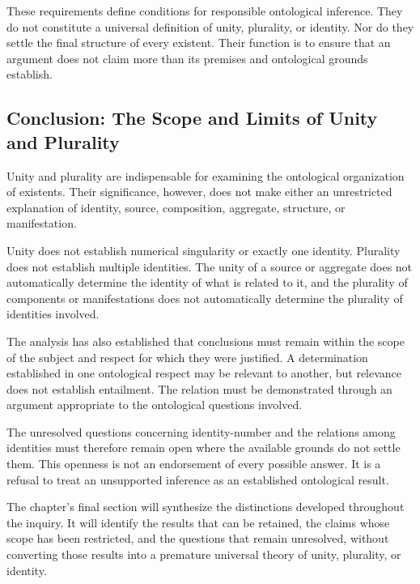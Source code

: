 

These requirements define conditions for
responsible ontological inference. They do
not constitute a universal definition of
unity, plurality, or identity. Nor do they
settle the final structure of every existent.
Their function is to ensure that an argument
does not claim more than its premises and
ontological grounds establish.

\subsection{Conclusion: The Scope and Limits of Unity and Plurality}

Unity and plurality are indispensable for
examining the ontological organization of
existents. Their significance, however,
does not make either an unrestricted
explanation of identity, source, composition,
aggregate, structure, or manifestation.

Unity does not establish numerical singularity
or exactly one identity. Plurality does not
establish multiple identities. The unity
of a source or aggregate does not automatically
determine the identity of what is related
to it, and the plurality of components or
manifestations does not automatically
determine the plurality of identities involved.

The analysis has also established that
conclusions must remain within the scope
of the subject and respect for which they
were justified. A determination established
in one ontological respect may be relevant
to another, but relevance does not establish
entailment. The relation must be demonstrated
through an argument appropriate to the
ontological questions involved.

The unresolved questions concerning
identity-number and the relations among
identities must therefore remain open
where the available grounds do not settle
them. This openness is not an endorsement
of every possible answer. It is a refusal
to treat an unsupported inference as an
established ontological result.

The chapter's final section will synthesize
the distinctions developed throughout
the inquiry. It will identify the results
that can be retained, the claims whose
scope has been restricted, and the questions
that remain unresolved, without converting
those results into a premature universal
theory of unity, plurality, or identity.

